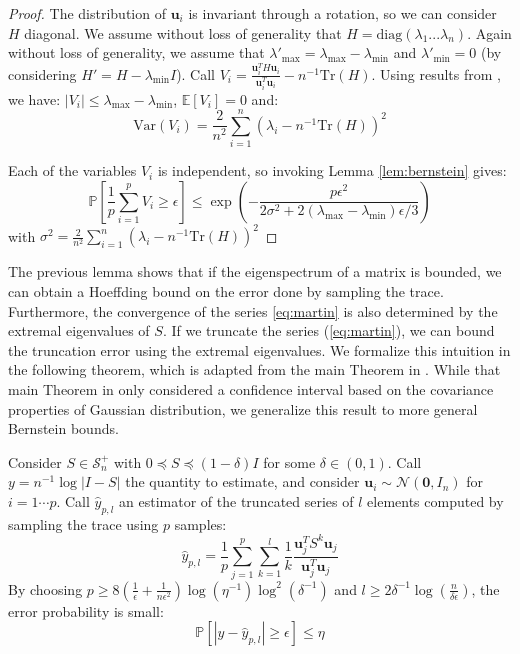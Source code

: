 \begin{proof} The distribution of $\mathbf{u}_{i}$ is invariant
through a rotation, so we can consider $H$ diagonal. We assume without
loss of generality that $H=\text{diag}\left(\lambda_{1}...\lambda_{n}\right)$.
Again without loss of generality, we assume that $\lambda'_{\max}=\lambda_{\max}-\lambda_{\min}$
and $\lambda'_{\min}=0$ (by considering $H'=H-\lambda_{\min}I$).
Call $V_{i}=\frac{\mathbf{u}_{i}^{T}H\mathbf{u}_{i}}{\mathbf{u}_{i}^{T}\mathbf{u}_{i}}-n^{-1}\text{Tr}\left(H\right)$.
Using results from \cite{Barry1999}, we have: $\left|V_{i}\right|\leq\lambda_{\max}-\lambda_{\min}$,
$\mathbb{E}\left[V_{i}\right]=0$ and: 
\[
\text{Var}\left(V_{i}\right)=\frac{2}{n^{2}}\sum_{i=1}^{n}\left(\lambda_{i}-n^{-1}\text{Tr}\left(H\right)\right)^{2}
\]


Each of the variables $V_{i}$ is independent, so invoking Lemma \ref{lem:bernstein}
gives: 
\[
\mathbb{P}\left[\frac{1}{p}\sum_{i=1}^{p}V_{i}\geq\epsilon\right]\leq\exp\left(-\frac{p\epsilon^{2}}{2\sigma^{2}+2\left(\lambda_{\max}-\lambda_{\min}\right)\epsilon/3}\right)
\]
with $\sigma^{2}=\frac{2}{n^{2}}\sum_{i=1}^{n}\left(\lambda_{i}-n^{-1}\text{Tr}\left(H\right)\right)^{2}$
\end{proof}

The previous lemma shows that if the eigenspectrum of a matrix is
bounded, we can obtain a Hoeffding bound on the error done by sampling
the trace. Furthermore, the convergence of the series \ref{eq:martin}
is also determined by the extremal eigenvalues of $S$. If we truncate
the series (\ref{eq:martin}), we can bound the truncation error using
the extremal eigenvalues. We formalize this intuition in the following
theorem, which is adapted from the main Theorem in \cite{Barry1999}.
While that main Theorem in \cite{Barry1999} only considered a confidence
interval based on the covariance properties of Gaussian distribution,
we generalize this result to more general Bernstein bounds.

\begin{theorem} \label{thm:det-sampling-theorem}Consider $S\in\mathcal{S}_{n}^{+}$
with $0\preceq S\preceq\left(1-\delta\right)I$ for some $\delta\in\left(0,1\right)$.
Call $y=n^{-1}\log\left|I-S\right|$ the quantity to estimate, and
consider $\mathbf{u}_{i}\sim\mathcal{N}\left(\mathbf{0},I_{n}\right)$
for $i=1\cdots p$. Call $\hat{y}_{p,l}$ an estimator of the truncated
series of $l$ elements computed by sampling the trace using $p$
samples: 
\[
\hat{y}_{p,l}=\frac{1}{p}\sum_{j=1}^{p}\sum_{k=1}^{l}\frac{1}{k}\frac{\mathbf{u}_{j}^{T}S^{k}\mathbf{u}_{j}}{\mathbf{u}_{j}^{T}\mathbf{u}_{j}}
\]
By choosing $p\geq8\left(\frac{1}{\epsilon}+\frac{1}{n\epsilon^{2}}\right)\log\left(\eta^{-1}\right)\log^{2}\left(\delta^{-1}\right)$
and $l\geq2\delta^{-1}\log\left(\frac{n}{\delta\epsilon}\right)$,
the error probability is small: 
\[
\mathbb{P}\left[\left|y-\hat{y}_{p,l}\right|\geq\epsilon\right]\leq\eta
\]
\end{theorem}

